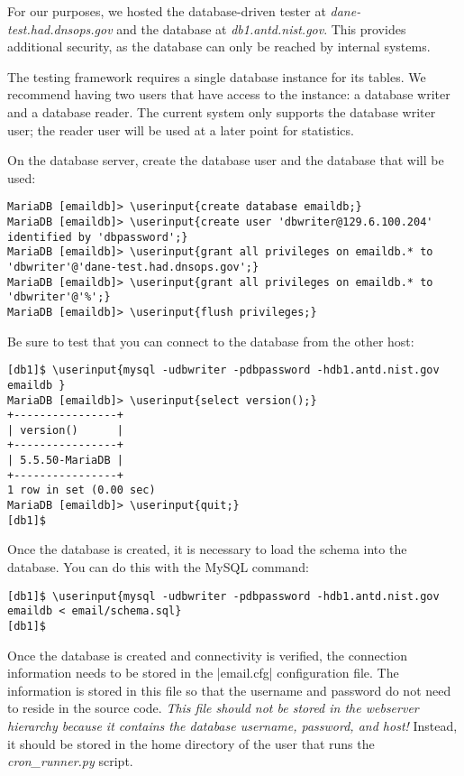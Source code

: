 \documentclass[preprint,3p,11pt]{elsarticle}
\newcommand\userinput[1]{\textbf{#1}}
\begin{document}
For our purposes, we hosted the database-driven tester at
\emph{dane-test.had.dnsops.gov} and the database at
\emph{db1.antd.nist.gov}. This provides additional security, as the
database can only be reached by internal systems.

The testing framework requires a single database instance for its
tables. We recommend having two users that have access to the
instance: a database writer and a database reader. The current system
only supports the database writer user; the reader user will be used
at a later point for statistics.

On the database server, create the database user and the database that
will be used:

\begin{Verbatim}[commandchars=\\\{\},fontsize=\small]
MariaDB [emaildb]> \userinput{create database emaildb;}
MariaDB [emaildb]> \userinput{create user 'dbwriter@129.6.100.204' identified by 'dbpassword';}
MariaDB [emaildb]> \userinput{grant all privileges on emaildb.* to 'dbwriter'@'dane-test.had.dnsops.gov';}
MariaDB [emaildb]> \userinput{grant all privileges on emaildb.* to 'dbwriter'@'%';}
MariaDB [emaildb]> \userinput{flush privileges;}
\end{Verbatim}

Be sure to test that you can connect to the database from the other host:

\begin{Verbatim}[commandchars=\\\{\},fontsize=\small]
[db1]$ \userinput{mysql -udbwriter -pdbpassword -hdb1.antd.nist.gov emaildb }
MariaDB [emaildb]> \userinput{select version();}
+----------------+
| version()      |
+----------------+
| 5.5.50-MariaDB |
+----------------+
1 row in set (0.00 sec)
MariaDB [emaildb]> \userinput{quit;}
[db1]$ 
\end{Verbatim}

Once the database is created, it is necessary to load the schema into
the database. You can do this with the MySQL command:

\begin{Verbatim}[commandchars=\\\{\},fontsize=\small]
[db1]$ \userinput{mysql -udbwriter -pdbpassword -hdb1.antd.nist.gov emaildb < email/schema.sql}
[db1]$
\end{Verbatim}

Once the database is created and connectivity is verified, the
connection information needs to be stored in the 
|email.cfg| configuration file. The information is stored in this file
so that the username and password do not need to reside in the source
code. \emph{This file should not be stored in the webserver
  hierarchy because it contains the database username, password, and
  host!} Instead, it should be stored in the home directory of the
user that runs the \emph{cron\_runner.py} script.
\end{document}
